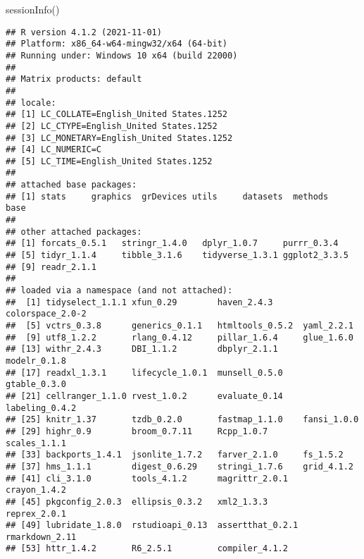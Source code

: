 \documentclass[
]{article}
\newenvironment{Shaded}{\begin{snugshade}}{\end{snugshade}}
\newcommand{\FunctionTok}[1]{\textcolor[rgb]{0.00,0.00,0.00}{#1}}
\newcommand{\NormalTok}[1]{#1}
\begin{document}
\begin{Shaded}
\begin{Highlighting}[]
\FunctionTok{sessionInfo}\NormalTok{()}
\end{Highlighting}
\end{Shaded}

\begin{verbatim}
## R version 4.1.2 (2021-11-01)
## Platform: x86_64-w64-mingw32/x64 (64-bit)
## Running under: Windows 10 x64 (build 22000)
## 
## Matrix products: default
## 
## locale:
## [1] LC_COLLATE=English_United States.1252 
## [2] LC_CTYPE=English_United States.1252   
## [3] LC_MONETARY=English_United States.1252
## [4] LC_NUMERIC=C                          
## [5] LC_TIME=English_United States.1252    
## 
## attached base packages:
## [1] stats     graphics  grDevices utils     datasets  methods   base     
## 
## other attached packages:
## [1] forcats_0.5.1   stringr_1.4.0   dplyr_1.0.7     purrr_0.3.4    
## [5] tidyr_1.1.4     tibble_3.1.6    tidyverse_1.3.1 ggplot2_3.3.5  
## [9] readr_2.1.1    
## 
## loaded via a namespace (and not attached):
##  [1] tidyselect_1.1.1 xfun_0.29        haven_2.4.3      colorspace_2.0-2
##  [5] vctrs_0.3.8      generics_0.1.1   htmltools_0.5.2  yaml_2.2.1      
##  [9] utf8_1.2.2       rlang_0.4.12     pillar_1.6.4     glue_1.6.0      
## [13] withr_2.4.3      DBI_1.1.2        dbplyr_2.1.1     modelr_0.1.8    
## [17] readxl_1.3.1     lifecycle_1.0.1  munsell_0.5.0    gtable_0.3.0    
## [21] cellranger_1.1.0 rvest_1.0.2      evaluate_0.14    labeling_0.4.2  
## [25] knitr_1.37       tzdb_0.2.0       fastmap_1.1.0    fansi_1.0.0     
## [29] highr_0.9        broom_0.7.11     Rcpp_1.0.7       scales_1.1.1    
## [33] backports_1.4.1  jsonlite_1.7.2   farver_2.1.0     fs_1.5.2        
## [37] hms_1.1.1        digest_0.6.29    stringi_1.7.6    grid_4.1.2      
## [41] cli_3.1.0        tools_4.1.2      magrittr_2.0.1   crayon_1.4.2    
## [45] pkgconfig_2.0.3  ellipsis_0.3.2   xml2_1.3.3       reprex_2.0.1    
## [49] lubridate_1.8.0  rstudioapi_0.13  assertthat_0.2.1 rmarkdown_2.11  
## [53] httr_1.4.2       R6_2.5.1         compiler_4.1.2
\end{verbatim}
\end{document}
